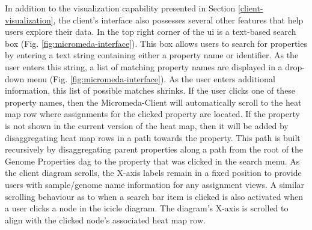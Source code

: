 In addition to the visualization capability presented in Section 
\ref{client-visualization}, the client's interface also possesses several other 
features that help users explore their data. In the top right corner of the 
\gls{ui} is a text-based search box (Fig. \ref{fig:micromeda-interface}). This 
box allows users to search for properties by entering a text string containing 
either a property name or identifier. As the user enters this string, a list of 
matching property names are displayed in a drop-down menu (Fig. 
\ref{fig:micromeda-interface}). As the user enters additional information, this 
list of possible matches shrinks. If the user clicks one of these property 
names, then the Micromeda-Client will automatically scroll to the heat map row 
where assignments for the clicked property are located. If the property is not 
shown in the current version of the heat map, then it will be added by 
disaggregating heat map rows in a path towards the property. This path is built 
recursively by disaggregating parent properties along a path from the root of 
the Genome Properties \gls{dag} to the property that was clicked in the search 
menu. As the client diagram scrolls, the X-axis labels remain in a fixed 
position to provide users with sample/genome name information for any assignment 
views. A similar scrolling behaviour as to when a search bar item is clicked is 
also activated when a user clicks a node in the icicle diagram. The diagram's 
X-axis is scrolled to align with the clicked node's associated heat map row.

